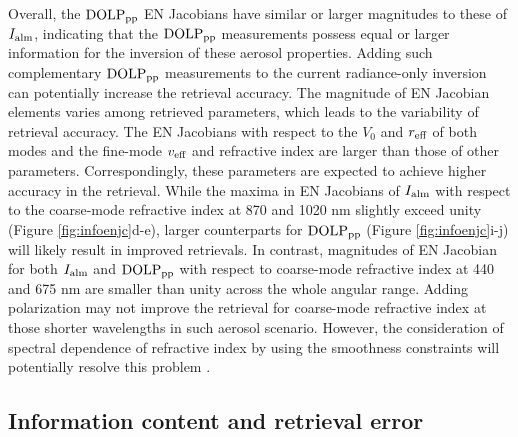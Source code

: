 Overall, the $\text{DOLP}_\text{pp}$ EN Jacobians have similar or larger magnitudes to these of
$I_\text{alm}$, indicating that the $\text{DOLP}_\text{pp}$ measurements possess equal or larger
information for the inversion of these aerosol properties. Adding such
complementary $\text{DOLP}_\text{pp}$ measurements to the current radiance-only inversion can
potentially increase the retrieval accuracy. The magnitude of EN Jacobian
elements varies among retrieved parameters, which leads to the variability of
retrieval accuracy. The EN Jacobians with respect to the $V_0$ and $r_\text{eff}$ of both
modes and the fine-mode $v_\text{eff}$ and refractive index are larger than those of
other parameters. Correspondingly, these parameters are expected to achieve
higher accuracy in the retrieval. While the maxima in EN Jacobians of $I_\text{alm}$
with respect to the coarse-mode refractive index at 870 and 1020 nm slightly
exceed unity (Figure \ref{fig:infoenjc}d-e), larger counterparts for $\text{DOLP}_\text{pp}$ 
(Figure \ref{fig:infoenjc}i-j) will likely result in improved retrievals. 
In contrast, magnitudes of EN Jacobian for both $I_\text{alm}$ and  $\text{DOLP}_\text{pp}$ with 
respect to coarse-mode refractive index at 440 and 675 nm are smaller than 
unity across the whole angular range. Adding polarization may not improve the
retrieval for coarse-mode refractive index at those shorter wavelengths in 
such aerosol scenario. However, the consideration of spectral dependence of 
refractive index by using the smoothness constraints will potentially resolve
this problem \citep{Dubovik04}.

\subsection{Information content and retrieval error}

